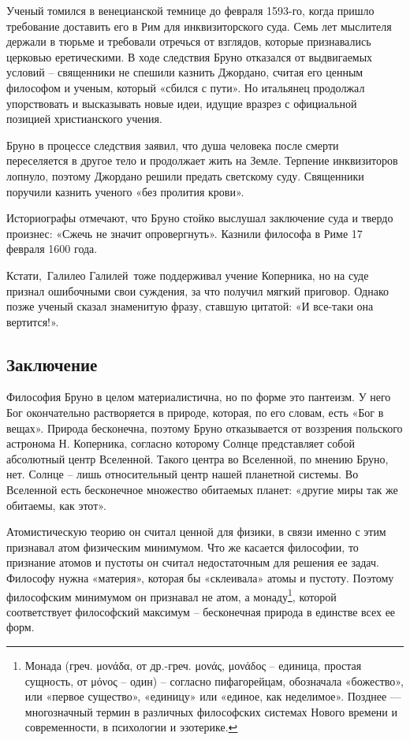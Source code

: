 \documentclass[
]{article}
\begin{document}
Ученый томился в венецианской темнице до февраля 1593-го, когда пришло
требование доставить его в Рим для инквизиторского суда. Семь лет
мыслителя держали в тюрьме и требовали отречься от взглядов, которые
признавались церковью еретическими. В ходе следствия Бруно отказался от
выдвигаемых условий -- священники не спешили казнить Джордано, считая
его ценным философом и ученым, который «сбился с пути». Но итальянец
продолжал упорствовать и высказывать новые идеи, идущие вразрез с
официальной позицией христианского учения.

Бруно в процессе следствия заявил, что душа человека после смерти
переселяется в другое тело и продолжает жить на Земле. Терпение
инквизиторов лопнуло, поэтому Джордано решили предать светскому суду.
Священники поручили казнить ученого «без пролития крови».

Историографы отмечают, что Бруно стойко выслушал заключение суда и
твердо произнес: «Сжечь не значит опровергнуть». Казнили философа в Риме
17 февраля 1600 года.

Кстати,~Галилео Галилей~тоже поддерживал учение Коперника, но на суде
признал ошибочными свои суждения, за что получил мягкий приговор. Однако
позже ученый сказал знаменитую фразу, ставшую цитатой: «И все-таки она
вертится!».

\hypertarget{ux437ux430ux43aux43bux44eux447ux435ux43dux438ux435-6}{%
\subsection{Заключение}\label{ux437ux430ux43aux43bux44eux447ux435ux43dux438ux435-6}}

Философия Бруно в целом материалистична, но по форме это пантеизм. У
него Бог окончательно растворяется в природе, которая, по его словам,
есть «Бог в вещах». Природа бесконечна, поэтому Бруно отказывается от
воззрения польского астронома Н. Коперника, согласно которому Солнце
представляет собой абсолютный центр Вселенной. Такого центра во
Вселенной, по мнению Бруно, нет. Солнце -- лишь относительный центр
нашей планетной системы. Во Вселенной есть бесконечное множество
обитаемых планет: «другие миры так же обитаемы, как этот».

Атомистическую теорию он считал ценной для физики, в связи именно с этим
признавал атом физическим минимумом. Что же касается философии, то
признание атомов и пустоты он считал недостаточным для решения ее задач.
Философу нужна «материя», которая бы «склеивала» атомы и пустоту.
Поэтому философским минимумом он признавал не атом, а монаду\footnote{Монада
  (греч. μονάδα, от др.-греч. μονάς, μονάδος -- единица, простая
  сущность, от μόνος -- один) -- согласно пифагорейцам, обозначала
  «божество», или «первое существо», «единицу» или «единое, как
  неделимое». Позднее --- многозначный термин в различных философских
  системах Нового времени и современности, в психологии и эзотерике.},
которой соответствует философский максимум -- бесконечная природа в
единстве всех ее форм.
\end{document}
